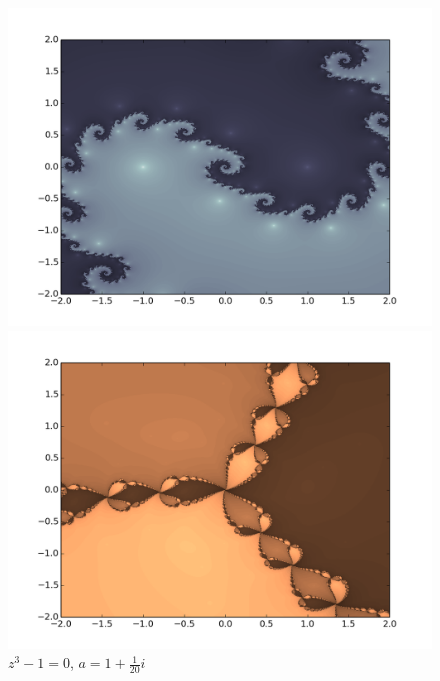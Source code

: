 \documentclass[12pt]{article}
\begin{document}
\begin{figure}[ht] 
  \label{ fig7} 
  \begin{minipage}[b]{0.5\linewidth}
    \centering
    \includegraphics[width=1\linewidth]{fractal_250_1500_2.png} 
    \caption*{$z^2 - 1 = 0$, $a = \frac{1}{2} + \frac{3}{4}i$} 
    \vspace{4ex}
  \end{minipage}%
  \begin{minipage}[b]{0.5\linewidth}
    \centering
    \includegraphics[width=1\linewidth]{fractal_50_1500_3.png} 
    \caption*{$z^3 - 1 = 0$, $a = 1 + \frac{1}{20}i$}
    \vspace{4ex}
  \end{minipage} 

\end{figure}
\end{document}

